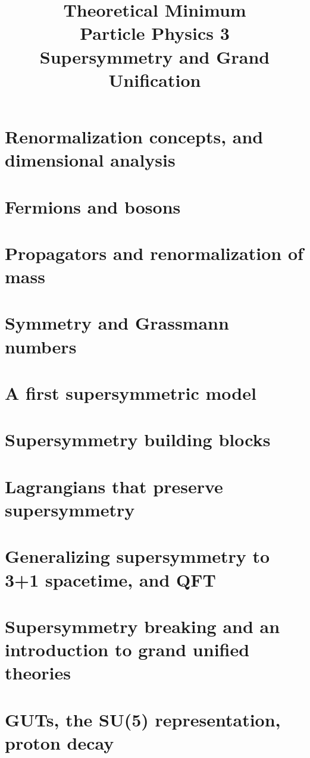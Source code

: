 \documentclass[]{article}
\title{Theoretical Minimum\\Particle Physics 3\\Supersymmetry and Grand Unification}
\author{}
\begin{document}
\maketitle

\begin{abstract}

\end{abstract}

\section{Renormalization concepts, and dimensional analysis}
\section{Fermions and bosons}
\section{Propagators and renormalization of mass}
\section{Symmetry and Grassmann numbers}
\section{A first supersymmetric model}
\section{Supersymmetry building blocks}
\section{Lagrangians that preserve supersymmetry}
\section{Generalizing supersymmetry to 3+1 spacetime, and QFT}
\section{Supersymmetry breaking and an introduction to grand unified theories}
\section{GUTs, the SU(5) representation, proton decay}
\end{document}
